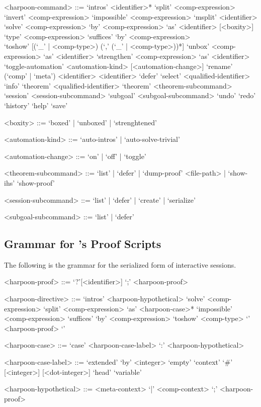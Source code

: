 \begin{grammar}
<harpoon-command> ::= `intros' <identifier>*
\alt `split' <comp-expression>
\alt `invert' <comp-expression>
\alt `impossible' <comp-expression>
\alt `msplit' <identifier>
\alt `solve' <comp-expression>
\alt `by' <comp-expression> `as' <identifier> [<boxity>]
\alt `type' <comp-expression>
\alt `suffices' `by' <comp-expression>\\
`toshow' [(`_' | <comp-type>) (`,' (`_' | <comp-type>))*]
\alt `unbox' <comp-expression> `as' <identifier>
\alt `strengthen' <comp-expression> `as' <identifier>
\alt `toggle-automation' <automation-kind> [<automation-change>]
\alt `rename' (`comp' | `meta') <identifier> <identifier>
\alt `defer'
\alt `select' <qualified-identifier>
\alt `info' `theorem' <qualified-identifier>
\alt `theorem' <theorem-subcommand>
\alt `session' <session-subcommand>
\alt `subgoal' <subgoal-subcommand>
\alt `undo'
\alt `redo'
\alt `history'
\alt `help'
\alt `save'

<boxity> ::= `boxed' | `unboxed' | `strenghtened'

<automation-kind> ::= `auto-intros' | `auto-solve-trivial'

<automation-change> ::= `on' | `off' | `toggle'

<theorem-subcommand> ::= `list' | `defer' | `dump-proof' <file-path> | `show-ihs' \alt `show-proof'

<session-subcommand> ::= `list' | `defer' | `create' | `serialize'

<subgoal-subcommand> ::= `list' | `defer'
\end{grammar}

\subsection{Grammar for \Harpoon's Proof Scripts}\label{section:syntax-harpoon-proof-scripts}

The following is the grammar for the serialized form of \Harpoon interactive sessions.

\begin{grammar}
<harpoon-proof> ::= `?'[<identifier>]
 `;' <harpoon-proof>

<harpoon-directive> ::= `intros' <harpoon-hypothetical>
\alt `solve' <comp-expression>
\alt `split' <comp-expression> `as' <harpoon-case>*
\alt `impossible' <comp-expression>
\alt `suffices' `by' <comp-expression> `toshow' <comp-type> `{' <harpoon-proof> `}'

<harpoon-case> ::= `case' <harpoon-case-label> `:' <harpoon-hypothetical>

<harpoon-case-label> ::= `extended' `by' <integer>
\alt `empty' `context'
\alt `#' [<integer>] [<dot-integer>]
\alt `head' `variable'

<harpoon-hypothetical> ::= <meta-context> `|' <comp-context> `;' <harpoon-proof>
\end{grammar}

